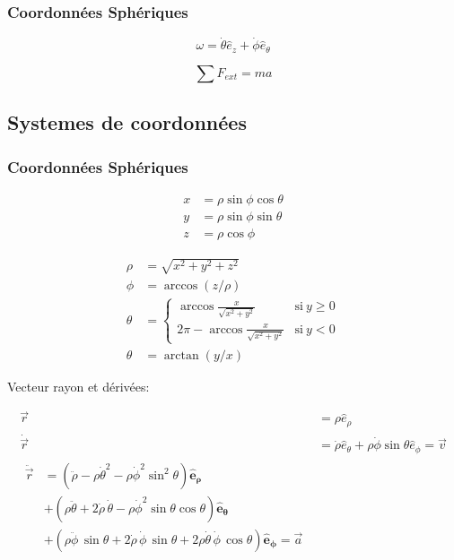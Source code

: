\documentclass[10pt,a4paper]{article}
\begin{document}
\subsubsection{Coordonnées Sphériques}

$$\omega = \dot\theta \hat e_z + \dot\phi \hat e_\theta$$

$$\sum F_{ext} = ma$$

\subsection{Systemes de coordonnées}
\subsubsection{Coordonnées Sphériques}

\begin{multicols}{3}

\begin{align*}
x & = \rho \sin \phi \cos \theta \\
y & = \rho \sin \phi \sin \theta \\
z & = \rho \cos \phi
\end{align*}

\columnbreak



\columnbreak


\begin{align*}
\rho   &= \sqrt{x^2+y^2+z^2}\\
\phi &= \arccos(z/\rho)\\
\theta &= \begin{cases}\arccos\frac{x}{\sqrt{x^2+y^2}} & \mathrm{si}\ y\geq{0} \\ 2\pi-\arccos\frac x{\sqrt{x^2+y^2}} & \mathrm{si}\ y < 0\end{cases}\\
\theta &= \arctan(y/x)
\end{align*}

\end{multicols}

Vecteur rayon et dérivées:

\begin{align*}
\vec{r} &= \rho \hat{e}_{\rho} \\
\dot{\vec{r}} &= \dot{\rho}\hat{e}_{\theta} + \rho\dot{\phi}\sin\theta\hat{e}_{\phi} = \vec{v} \\
\begin{split}
\ddot{\vec{r}} &= \left( \ddot{\rho} - \rho\dot\theta^2 - \rho\dot\phi^2\sin^2\theta \right)\mathbf{\hat{e}_\rho} \\
&+ \left( \rho\ddot\theta + 2\dot{\rho}\,\dot\theta - \rho\dot\phi^2\sin\theta\cos\theta \right) \mathbf{\hat{e}_\theta}\\
&+ \left( \rho\ddot\phi\,\sin\theta + 2\dot{\rho}\,\dot\phi\,\sin\theta + 2 \rho\dot\theta\,\dot\phi\,\cos\theta \right) \mathbf{\hat{e}_\phi} = \vec{a}
\end{split}
\end{align*}
\end{document}
